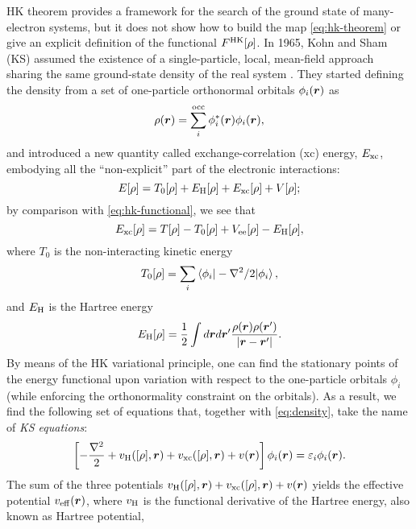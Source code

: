HK theorem provides a framework for the search of the ground state of many-electron systems, but it does not show how to build the map \eqref{eq:hk-theorem} or give an explicit definition of the functional $F^{\rm HK}[\rho]$. In 1965, Kohn and Sham (KS) assumed the existence of a single-particle, local, mean-field approach sharing the same ground-state density of the real system \cite{kohn_self-consistent_1965}. They started defining the density from a set of one-particle orthonormal orbitals $\phi_i({\bm r})$ as
%
\begin{equation}
    \rho({\bm r}) = \sum_i^{\rm occ} \phi^*_i({\bm r}) \phi_i({\bm r}) ,
    \label{eq:density}
\end{equation}
%
and introduced a new quantity called exchange-correlation (xc) energy, $E_{\rm xc}$, embodying all the ``non-explicit'' part of the electronic interactions:
%
\begin{equation}
    E[\rho] = T_0[\rho] + E_{\rm H}[\rho] + E_{\rm xc}[\rho] + V[\rho] ;
    \label{eq:energy-functional}
\end{equation}
%
by comparison with \cref{eq:hk-functional}, we see that
%
\begin{equation}
    E_{\rm xc}[\rho] = T[\rho] - T_0[\rho] + V_{\rm ee}[\rho] - E_{\rm H}[\rho] ,
    \label{eq:xc-energy}
\end{equation}
%
where $T_0$ is the non-interacting kinetic energy
%
\begin{equation}
    T_0[\rho] = \sum_i \braket{\phi_i | -\nabla^2/2 | \phi_i} ,
    \label{eq:non-int-kinetic}
\end{equation}
%
and $E_{\rm H}$ is the Hartree energy
\begin{equation}
    E_{\rm H}[\rho] = \frac{1}{2} \int d{\bm r} d{\bm r}' \frac{\rho({\bm r})\rho({\bm r}')}{|{\bm r}-{\bm r}'|} .
    \label{eq:hartree-energy}
\end{equation}
%
By means of the HK variational principle, one can find the stationary points of the energy functional upon variation with respect to the one-particle orbitals $\phi_i$ (while enforcing the orthonormality constraint on the orbitals). As a result, we find the following set of equations that, together with \cref{eq:density}, take the name of \emph{KS equations}:
%
\begin{equation}
    \left[ - \frac{\nabla^2}{2} + v_{\rm H}([\rho],{\bm r}) + v_{\rm xc}([\rho],{\bm r}) + v({\bm r}) \right] \phi_i({\bm r}) = \varepsilon_i \phi_i({\bm r}) .
    \label{eq:ks-equations}
\end{equation}
%
The sum of the three potentials $v_{\rm H}([\rho],{\bm r}) + v_{\rm xc}([\rho],{\bm r}) + v({\bm r})$ yields the effective potential $v_{\rm eff}({\bm r})$, where $v_{\rm H}$ is the functional derivative of the Hartree energy, also known as Hartree potential,
